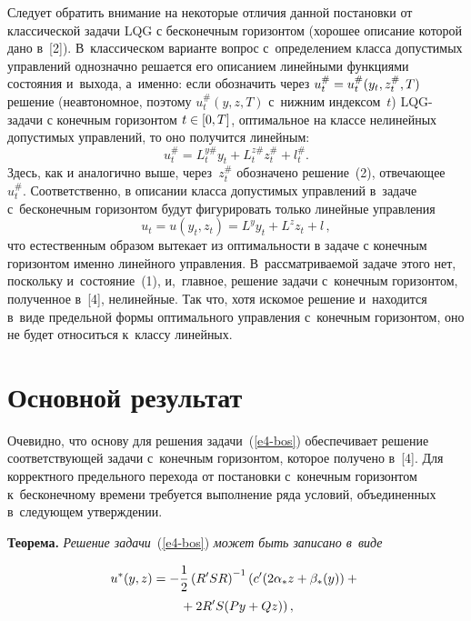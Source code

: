 \begin{multicols}{2}
     Следует обратить внимание на некоторые отличия данной постановки 
от классической задачи LQG с бесконечным горизонтом (хорошее описание 
которой дано в~[2]). В~классическом варианте вопрос с~определением класса 
допустимых управ\-ле\-ний однозначно решается его описанием линейными 
функциями со\-сто\-яния и~выхода, а~именно: если обозначить через $u_t^\# 
\hm= u_t^\# (y_t, z_t^\#, T)$ решение (неавтономное, поэтому $u_t^\#(y,z,T)$ 
с~нижним индексом~$t$) LQG-за\-да\-чи с конечным горизонтом $t\hm\in 
[0,T]$, оптимальное на классе нелинейных до\-пус\-ти\-мых управ\-ле\-ний, то оно 
получится линейным: 
$$
u_t^\# = L_t^{y\#} y_t + L_t^{z\#} z_t^\# +  l_t^\#.
$$ 
%
Здесь, как и аналогично выше, через~$z_t^\#$  обозначено 
решение~(2), от\-ве\-ча\-ющее~$u_t^\#$. Соответственно, в описании класса 
допустимых управ\-ле\-ний в~задаче с~бесконечным горизонтом будут 
фигурировать только линейные управ\-ления 
$$
u_t= u\left(y_t,z_t\right)= L^y  y_t+ L^z z_t+l\,,
$$
 что естественным образом вытекает из оп\-ти\-маль\-ности 
в задаче с конечным горизонтом именно линейного управ\-ле\-ния. 
В~рас\-смат\-ри\-ва\-емой задаче этого нет, поскольку и~со\-сто\-яние~(1), 
и,~главное, решение задачи с~конечным горизонтом, полученное в~[4], 
нелинейные. Так что, хотя искомое решение и~находится в~виде предельной 
формы оптимального управ\-ле\-ния с~конечным горизонтом, оно не будет 
относиться к~классу линейных.
     
\section{Основной результат}

     Очевидно, что основу для решения задачи~(\ref{e4-bos}) обеспечивает 
решение со\-от\-вет\-ст\-ву\-ющей задачи с~конечным горизонтом, которое получено 
в~[4]. Для корректного предельного перехода от постановки с~конечным 
горизонтом к~бесконечному времени требуется выполнение ряда условий, 
объединенных в~сле\-ду\-ющем утверж\-де\-нии.
     
     \smallskip
     
     \noindent
     \textbf{Теорема.} \textit{Решение задачи}~(\ref{e4-bos}) \textit{может 
быть записано в~виде}

\vspace*{-4pt}

\noindent
     \begin{multline}
     u^*(y,z)=-\displaystyle\frac{\displaystyle 1\mathstrut}{\displaystyle 2\mathstrut}\left( R^\prime SR\right)^{-1} \left( c^\prime(2\alpha_* z+\beta_*(y))+{}\right.\\
    \left. {}+2R^\prime S(Py+Qz)\right),
     \label{e5-bos}
     \end{multline}
     

\end{multicols}
